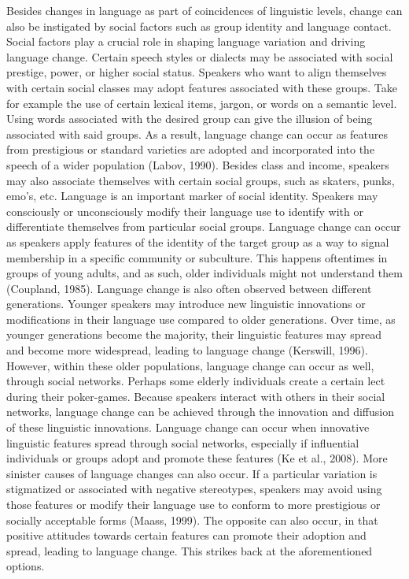 Besides changes in language as part of coincidences of linguistic levels, change can also be instigated by social factors such as group identity and language contact. Social factors play a crucial role in shaping language variation and driving language change. Certain speech styles or dialects may be associated with social prestige, power, or higher social status. Speakers who want to align themselves with certain social classes may adopt features associated with these groups. Take for example the use of certain lexical items, jargon, or words on a semantic level. Using words associated with the desired group can give the illusion of being associated with said groups. As a result, language change can occur as features from prestigious or standard varieties are adopted and incorporated into the speech of a wider population (Labov, 1990). Besides class and income, speakers may also associate themselves with certain social groups, such as skaters, punks, emo’s, etc. Language is an important marker of social identity. Speakers may consciously or unconsciously modify their language use to identify with or differentiate themselves from particular social groups. Language change can occur as speakers apply features of the identity of the target group as a way to signal membership in a specific community or subculture. This happens oftentimes in groups of young adults, and as such, older individuals might not understand them (Coupland, 1985). Language change is also often observed between different generations. Younger speakers may introduce new linguistic innovations or modifications in their language use compared to older generations. Over time, as younger generations become the majority, their linguistic features may spread and become more widespread, leading to language change (Kerswill, 1996). However, within these older populations, language change can occur as well, through social networks. Perhaps some elderly individuals create a certain lect during their poker-games. Because speakers interact with others in their social networks, language change can be achieved through the innovation and diffusion of these linguistic innovations. Language change can occur when innovative linguistic features spread through social networks, especially if influential individuals or groups adopt and promote these features (Ke et al., 2008). More sinister causes of language changes can also occur. If a particular variation is stigmatized or associated with negative stereotypes, speakers may avoid using those features or modify their language use to conform to more prestigious or socially acceptable forms (Maass, 1999). The opposite can also occur, in that positive attitudes towards certain features can promote their adoption and spread, leading to language change. This strikes back at the aforementioned options. 

